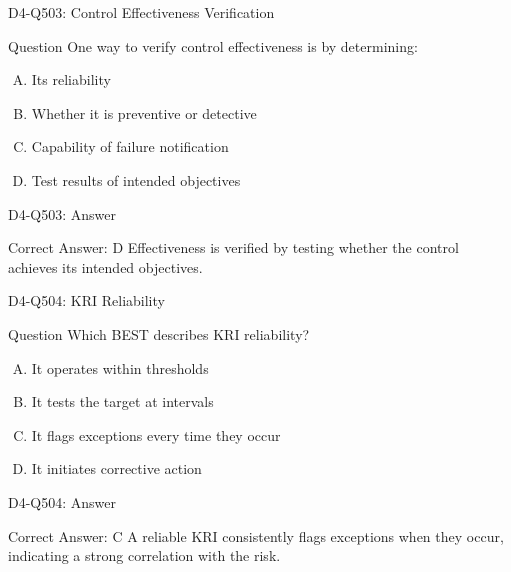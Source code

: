 \documentclass{beamer}
\begin{document}
\begin{frame}{D4-Q503: Control Effectiveness Verification}
	\begin{block}{Question}
		One way to verify control effectiveness is by determining:
	\end{block}
	\begin{enumerate}[(A)]
		\item Its reliability
		\item Whether it is preventive or detective
		\item Capability of failure notification
		\item Test results of intended objectives
	\end{enumerate}
\end{frame}
\begin{frame}{D4-Q503: Answer}
	\begin{block}{Correct Answer: D}
		Effectiveness is verified by testing whether the control achieves its intended objectives.
	\end{block}
\end{frame}

\begin{frame}{D4-Q504: KRI Reliability}
	\begin{block}{Question}
		Which BEST describes KRI reliability?
	\end{block}
	\begin{enumerate}[(A)]
		\item It operates within thresholds
		\item It tests the target at intervals
		\item It flags exceptions every time they occur
		\item It initiates corrective action
	\end{enumerate}
\end{frame}
\begin{frame}{D4-Q504: Answer}
	\begin{block}{Correct Answer: C}
		A reliable KRI consistently flags exceptions when they occur, indicating a strong correlation with the risk.
	\end{block}
\end{frame}
\end{document}
